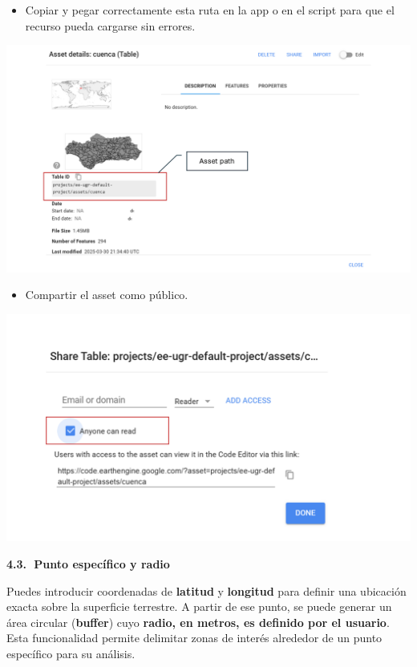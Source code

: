 \documentclass[
]{book}
\providecommand{\tightlist}{%
  \setlength{\itemsep}{0pt}\setlength{\parskip}{0pt}}
\begin{document}
\begin{itemize}
\tightlist
\item
  Copiar y pegar correctamente esta ruta en la app o en el script para que el recurso pueda cargarse sin errores.
\end{itemize}

\includegraphics{assets/asset1.png}

\begin{itemize}
\tightlist
\item
  Compartir el asset como público.
\end{itemize}

\includegraphics{assets/asset_2.png}

\textbf{4.3. 📌Punto específico y radio}

Puedes introducir coordenadas de \textbf{latitud} y \textbf{longitud} para definir una ubicación exacta sobre la superficie terrestre. A partir de ese punto, se puede generar un área circular (\textbf{buffer}) cuyo \textbf{radio, en metros, es definido por el usuario}. Esta funcionalidad permite delimitar zonas de interés alrededor de un punto específico para su análisis.
\end{document}
